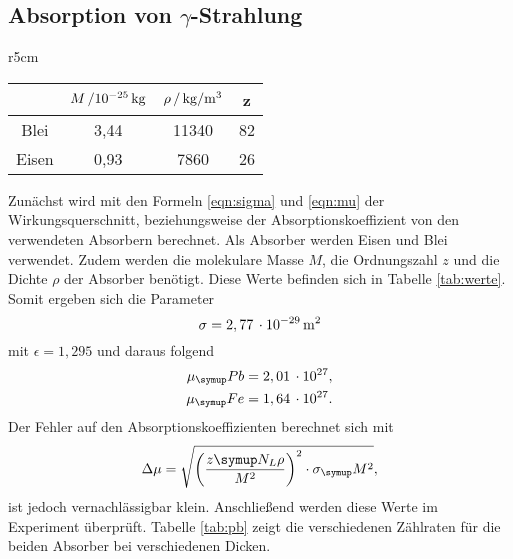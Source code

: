 \subsection{\texorpdfstring{Absorption von $\gamma$}{(Absorption von gamma)}-Strahlung}
\begin{wraptable}{r}{5cm}
  \centering
  \caption{Daten zu Eisen und Blei.}
  \begin{tabular}{cccc}
    \toprule
    & $M\,/10^{-25}\,\si{\kilo\gram}$ & $\rho\,/\,\si{\kilo\gram\per\cubic\meter}$ & z \\
    \midrule
    Blei  & 3,44 \cite{Mpb} & 11340 \cite{dichte} & 82 \\
    Eisen & 0,93 \cite{Mfe} &  7860 \cite{dichte} & 26 \\
  \end{tabular}
  \label{tab:werte}
\end{wraptable}
Zunächst wird mit den Formeln \eqref{eqn:sigma} und \eqref{eqn:mu} der
Wirkungsquerschnitt, beziehungsweise der Absorptionskoeffizient von den
verwendeten Absorbern berechnet. Als Absorber werden Eisen und Blei verwendet.
Zudem werden die molekulare Masse $M$, die Ordnungszahl $z$ und die Dichte $\rho$
der Absorber benötigt.
Diese Werte befinden sich in Tabelle \ref{tab:werte}.
Somit ergeben sich die Parameter
\begin{equation*}
  \sigma = 2,77\,\cdot10^{-29}\,\si{\square\meter}
\end{equation*}
mit $\epsilon=1,295$ und daraus folgend
\begin{align*}
  \mu_\su{Pb} &= 2,01\,\cdot 10^{27}, \\
  \mu_\su{Fe} &= 1,64\,\cdot 10^{27}.
\end{align*}
Der Fehler auf den Absorptionskoeffizienten berechnet sich mit
\begin{equation*}
  \Delta\mu = \sqrt{\lf(\frac{z\su{N_L}\rho}{M^2}\rt)^2\cdot\sigma_\su{M}^2},
\end{equation*}
ist jedoch vernachlässigbar klein.
Anschließend werden diese Werte im Experiment überprüft. Tabelle \ref{tab:pb}
zeigt die verschiedenen Zählraten für die beiden Absorber bei verschiedenen Dicken.
